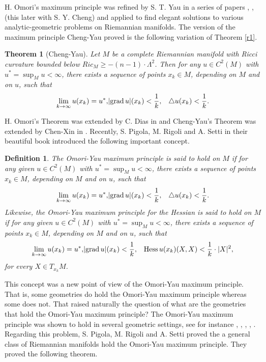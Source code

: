 \documentclass[a4paper]{amsart}
\newtheorem{theorem}{Theorem}
\newtheorem{definition}{Definition}
\begin{document}
H. Omori's maximum principle was refined by S. T. Yau in a series of papers    \cite{yau}, \cite{yau2}, \cite{cheng-yau} (this later with S. Y. Cheng)  and applied to find elegant solutions to various analytic-geometric problems on Riemannian manifolds.  The version of the maximum principle Cheng-Yau proved  is the following variation of Theorem \ref{r1}.

\begin{theorem}[Cheng-Yau]\label{r2}
 Let $M$ be a complete Riemannian manifold with Ricci curvature  bounded below $Ric_{M}\geq -(n-1)\cdot\Lambda^{2}$. Then for any $u\in C^{2}(M)$ with $u^{\ast}=\sup_{M}u<\infty$, there exists a sequence of points $x_{k}\in M$, depending on $M$ and on $u$,  such that
\begin{eqnarray}\label{eq-omori}
\lim_{k\to \infty}u(x_{k}) =u^{\ast},& \vert {{{\rm{grad}\,}}} u\vert  (x_{k}) < \displaystyle \frac{1}{k},&  \triangle u(x_{k}) <  \displaystyle \frac{1}{k}.
\end{eqnarray}
\end{theorem}
H. Omori's  Theorem was  extended by C. Dias in \cite{dias} and Cheng-Yau's Theorem was extended by  Chen-Xin in \cite{chen-xin}. Recently,
 S. Pigola, M. Rigoli and A. Setti in their beautiful book \cite{prs-memoirs} introduced the following important concept.
 \begin{definition} The Omori-Yau maximum principle is said to hold on $M$ if for any given $u\in C^{2}(M)$ with $u^{\ast}=\sup_{M}u<\infty$, there exists a sequence of points $x_{k}\in M$, depending on $M$ and on $u$,  such that
\begin{eqnarray}\label{eq-omori-2}
\lim_{k\to \infty}u(x_{k}) =u^{\ast},& \vert {{{\rm{grad}\,}}} u\vert  (x_{k}) < \displaystyle \frac{1}{k},&  \triangle u(x_{k}) <  \displaystyle \frac{1}{k}.
\end{eqnarray} Likewise, the Omori-Yau maximum principle \textit{for the Hessian} is said to hold on $M$ if for any given $u\in C^{2}(M)$ with $u^{\ast}=\sup_{M}u<\infty$, there exists a sequence of points $x_{k}\in M$, depending on $M$ and on $u$,  such that \begin{eqnarray}\label{eq-omori}
\lim_{k\to \infty}u(x_{k}) =u^{\ast},& \vert {{{\rm{grad}\,}}} u\vert  (x_{k}) < \displaystyle \frac{1}{k},&  \operatorname{Hess} u(x_{k})(X,X) <  \displaystyle \frac{1}{k}\cdot \vert  X \vert^{2},
\end{eqnarray}for every $X\in T_{x_k}M$.
 \end{definition} This concept  was a new point of view of the Omori-Yau maximum principle. That is,  some geometries  do hold the Omori-Yau maximum principle whereas some does not.  That raised naturally the question of what are the geometries that hold the Omori-Yau maximum principle? The Omori-Yau maximum principle was shown to hold in several   geometric  settings, see for instance \cite{bps-revista}, \cite {fontenele-xavier}, \cite{lee-kim}, \cite{pigola-rigoli-rimoldi}, \cite{ratto-rigoli-setti}. Regarding this problem, S. Pigola, M. Rigoli and A. Setti \cite[pp. 7--10]{prs-memoirs} proved the a general class of Riemannian manifolds hold the  Omori-Yau maximum principle. They proved the following theorem.
\end{document}
